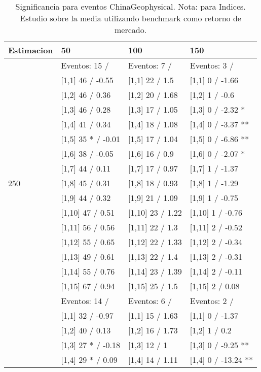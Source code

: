 \begin{table}

\caption{Significancia para eventos ChinaGeophysical. Nota: para Indices. Estudio sobre la media utilizando benchmark como retorno de mercado.}
\centering
\begin{tabular}[t]{llll}
\toprule
Estimacion & 50 & 100 & 150\\
\midrule
 & Eventos:  15 / & Eventos:  7 / & Eventos:  3 /\\
 & {}[1,1] 46  / -0.55 & {}[1,1] 22  / 1.5 & {}[1,1] 0  / -1.66\\
 & {}[1,2] 46  / 0.36 & {}[1,2] 20  / 1.68 & {}[1,2] 1  / -0.6\\
 & {}[1,3] 46  / 0.28 & {}[1,3] 17  / 1.05 & {}[1,3] 0  / -2.32 *\\
 & {}[1,4] 41  / 0.34 & {}[1,4] 18  / 1.08 & {}[1,4] 0  / -3.37 **\\
\addlinespace
 & {}[1,5] 35 * / -0.01 & {}[1,5] 17  / 1.04 & {}[1,5] 0  / -6.86 **\\
 & {}[1,6] 38  / -0.05 & {}[1,6] 16  / 0.9 & {}[1,6] 0  / -2.07 *\\
 & {}[1,7] 44  / 0.11 & {}[1,7] 17  / 0.97 & {}[1,7] 1  / -1.37\\
250 & {}[1,8] 45  / 0.31 & {}[1,8] 18  / 0.93 & {}[1,8] 1  / -1.29\\
 & {}[1,9] 44  / 0.32 & {}[1,9] 21  / 1.09 & {}[1,9] 1  / -0.75\\
\addlinespace
 & {}[1,10] 47  / 0.51 & {}[1,10] 23  / 1.22 & {}[1,10] 1  / -0.76\\
 & {}[1,11] 56  / 0.56 & {}[1,11] 22  / 1.3 & {}[1,11] 2  / -0.52\\
 & {}[1,12] 55  / 0.65 & {}[1,12] 22  / 1.33 & {}[1,12] 2  / -0.34\\
 & {}[1,13] 49  / 0.61 & {}[1,13] 22  / 1.4 & {}[1,13] 2  / -0.31\\
 & {}[1,14] 55  / 0.76 & {}[1,14] 23  / 1.39 & {}[1,14] 2  / -0.11\\
\addlinespace
 & {}[1,15] 67  / 0.94 & {}[1,15] 25  / 1.5 & {}[1,15] 2  / 0.08\\
 & Eventos:  14 / & Eventos:  6 / & Eventos:  2 /\\
 & {}[1,1] 32  / -0.97 & {}[1,1] 15  / 1.63 & {}[1,1] 0  / -1.37\\
 & {}[1,2] 40  / 0.13 & {}[1,2] 16  / 1.73 & {}[1,2] 1  / 0.2\\
 & {}[1,3] 27 * / -0.18 & {}[1,3] 12  / 1 & {}[1,3] 0  / -9.25 **\\
\addlinespace
 & {}[1,4] 29 * / 0.09 & {}[1,4] 14  / 1.11 & {}[1,4] 0  / -13.24 **\\

\end{tabular}
\end{table}
